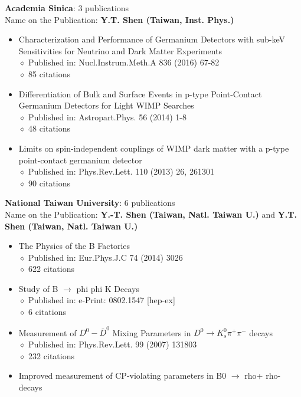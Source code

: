 \documentclass[margin, 10pt]{res} %
\begin{document}
\begin{resume}
\begin{itemize}
\end{itemize}
\textbf{Academia Sinica}: 3 publications\\
\textrm{Name on the Publication: }\textbf{Y.T. Shen (Taiwan, Inst. Phys.)}\\
\begin{itemize}
    \item Characterization and Performance of Germanium Detectors with sub-keV Sensitivities for Neutrino and Dark Matter Experiments\\
    $\diamond$ Published in: Nucl.Instrum.Meth.A 836 (2016) 67-82\\
    $\diamond$ 85 citations
    \item Differentiation of Bulk and Surface Events in p-type Point-Contact Germanium Detectors for Light WIMP Searches\\
    $\diamond$ Published in: Astropart.Phys. 56 (2014) 1-8\\
    $\diamond$ 48 citations
    \item Limits on spin-independent couplings of WIMP dark matter with a p-type point-contact germanium detector\\
    $\diamond$ Published in: Phys.Rev.Lett. 110 (2013) 26, 261301\\
    $\diamond$ 90 citations
\end{itemize}
\textbf{National Taiwan University}: 6 publications\\
\textrm{Name on the Publication: }\textbf{Y.-T. Shen (Taiwan, Natl. Taiwan U.)} and \textbf{Y.T. Shen (Taiwan, Natl. Taiwan U.)}\\
\begin{itemize}
    \item The Physics of the B Factories\\
    $\diamond$ Published in: Eur.Phys.J.C 74 (2014) 3026\\
    $\diamond$ 622 citations
    \item Study of B $\rightarrow$ phi phi K Decays\\
    $\diamond$ Published in: e-Print: 0802.1547 [hep-ex]\\
    $\diamond$ 6 citations
    \item Measurement of $D^{0} - \bar{D}^{0}$ Mixing Parameters in $D^{0} \rightarrow K^{0}_{s}\pi^{+}\pi^{-}$ decays\\
    $\diamond$ Published in: Phys.Rev.Lett. 99 (2007) 131803\\
    $\diamond$ 232 citations
    \item Improved measurement of CP-violating parameters in B0 $\rightarrow$ rho+ rho- decays\\

\end{itemize}
\end{resume}
\end{document}
